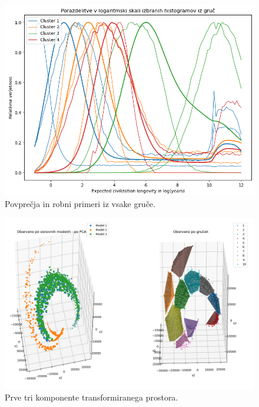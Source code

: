 \documentclass[a4paper]{IEEEtran}
\begin{document}
\begin{figure}
	\centering
	\includegraphics[width=0.9\linewidth]{Figures/log4konveks}
	\caption{Povprečja in robni primeri iz vsake gruče.}
	\label{fig:log4konveks}
\end{figure}

\begin{figure}
	\centering
	\includegraphics[width=0.9\linewidth]{Figures/log10pca}
	\caption{Prve tri komponente transformiranega prostora.}
	\label{fig:log10pca}
\end{figure}
\end{document}
